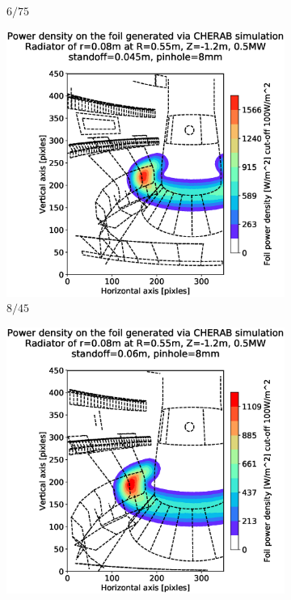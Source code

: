 \begin{figure}[!ht]
\begin{subfigure}{0.325\textwidth}
         \caption{$6/75$}
         \label{fig:6_75}
     \end{subfigure}
     \begin{subfigure}{0.32\textwidth}
         \centering
         \includegraphics[trim={85 25 49 80},clip,width=\textwidth]{Chapters/chapter2/figs/measured_power_8_45radiator_R0.55_Z-1.2_r0.08.stl.eps}
         \caption{$8/45$}
         \label{fig:8_45}
     \end{subfigure}
     \hfill
     \begin{subfigure}{0.32\textwidth}
         \centering
         \includegraphics[trim={85 25 49 80},clip,width=\textwidth]{Chapters/chapter2/figs/measured_power_8_60radiator_R0.55_Z-1.2_r0.08.stl.eps}

\end{subfigure}
\end{figure}
